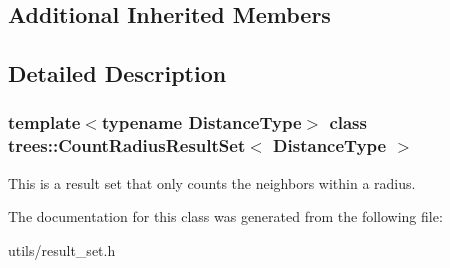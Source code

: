 \subsection*{Additional Inherited Members}


\subsection{Detailed Description}
\subsubsection*{template$<$typename Distance\+Type$>$\newline
class trees\+::\+Count\+Radius\+Result\+Set$<$ Distance\+Type $>$}

This is a result set that only counts the neighbors within a radius. 

The documentation for this class was generated from the following file\+:\begin{DoxyCompactItemize}
\item 
utils/result\+\_\+set.\+h\end{DoxyCompactItemize}
